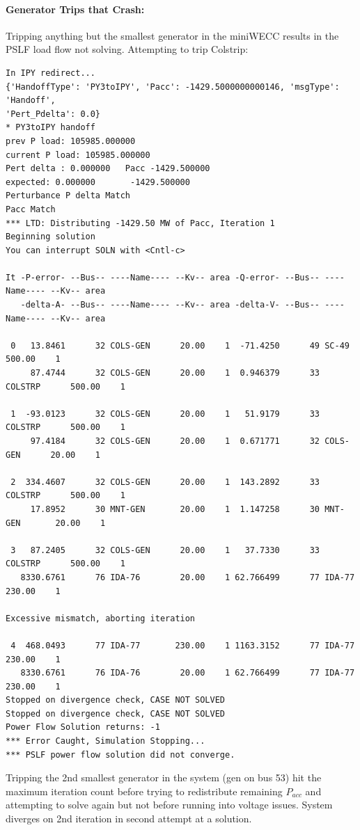 \documentclass[12pt]{article}
\begin{document}
\pagebreak
\paragraph{Generator Trips that Crash:} Tripping anything but the smallest generator in the miniWECC results in the PSLF load flow not solving. Attempting to trip Colstrip:
\begin{Verbatim}
In IPY redirect...
{'HandoffType': 'PY3toIPY', 'Pacc': -1429.5000000000146, 'msgType': 'Handoff', 
'Pert_Pdelta': 0.0}
* PY3toIPY handoff
prev P load: 105985.000000
current P load: 105985.000000
Pert delta : 0.000000   Pacc -1429.500000
expected: 0.000000       -1429.500000
Perturbance P delta Match
Pacc Match
*** LTD: Distributing -1429.50 MW of Pacc, Iteration 1
Beginning solution
You can interrupt SOLN with <Cntl-c>

It -P-error- --Bus-- ----Name---- --Kv-- area -Q-error- --Bus-- ----Name---- --Kv-- area
   -delta-A- --Bus-- ----Name---- --Kv-- area -delta-V- --Bus-- ----Name---- --Kv-- area

 0   13.8461      32 COLS-GEN      20.00    1  -71.4250      49 SC-49        500.00    1
     87.4744      32 COLS-GEN      20.00    1  0.946379      33 COLSTRP      500.00    1

 1  -93.0123      32 COLS-GEN      20.00    1   51.9179      33 COLSTRP      500.00    1
     97.4184      32 COLS-GEN      20.00    1  0.671771      32 COLS-GEN      20.00    1

 2  334.4607      32 COLS-GEN      20.00    1  143.2892      33 COLSTRP      500.00    1
     17.8952      30 MNT-GEN       20.00    1  1.147258      30 MNT-GEN       20.00    1

 3   87.2405      32 COLS-GEN      20.00    1   37.7330      33 COLSTRP      500.00    1
   8330.6761      76 IDA-76        20.00    1 62.766499      77 IDA-77       230.00    1

Excessive mismatch, aborting iteration

 4  468.0493      77 IDA-77       230.00    1 1163.3152      77 IDA-77       230.00    1
   8330.6761      76 IDA-76        20.00    1 62.766499      77 IDA-77       230.00    1
Stopped on divergence check, CASE NOT SOLVED
Stopped on divergence check, CASE NOT SOLVED
Power Flow Solution returns: -1
*** Error Caught, Simulation Stopping...
*** PSLF power flow solution did not converge.
\end{Verbatim}

\pagebreak

Tripping the 2nd smallest generator in the system (gen on bus 53) hit the maximum iteration count before trying to redistribute remaining $P_{acc}$ and attempting to solve again but not before running into voltage issues. System diverges on 2nd iteration in second attempt at a solution.
\end{document}

